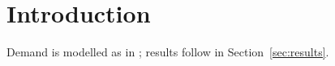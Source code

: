 \section{Introduction}\label{sec:intro}
Demand is modelled as in \cite{smith2025}; results follow in Section~\ref{sec:results}.
